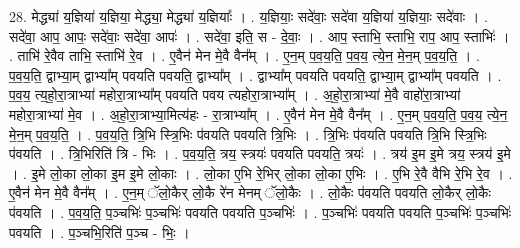 \documentclass[17pt]{extarticle}
\begin{document}
28. मेद्ध्या॑ य॒ज्ञिया॑ य॒ज्ञिया॒ मेद्ध्या॒ मेद्ध्या॑ य॒ज्ञियाः᳚ । . य॒ज्ञियाः॒ सदे॑वाः॒ सदे॑वा य॒ज्ञिया॑ य॒ज्ञियाः॒ सदे॑वाः । . सदे॑वा॒ आप॒ आपः॒ सदे॑वाः॒ सदे॑वा॒ आपः॑ । . सदे॑वा॒ इति॒ स - दे॒वाः॒ । . आप॒ स्ताभि॒ स्ताभि॒ राप॒ आप॒ स्ताभिः॑ । . ताभि॑ रे॒वैव ताभि॒ स्ताभि॑ रे॒व । . ए॒वैन॑ मेन मे॒वै वैन᳚म् । . ए॒न॒म् प॒व॒य॒ति॒ प॒व॒य॒ त्ये॒न॒ मे॒न॒म् प॒व॒य॒ति॒ । . प॒व॒य॒ति॒ द्वाभ्या॒म् द्वाभ्या᳚म् पवयति पवयति॒ द्वाभ्या᳚म् । . द्वाभ्या᳚म् पवयति पवयति॒ द्वाभ्या॒म् द्वाभ्या᳚म् पवयति । . प॒व॒य॒ त्य॒हो॒रा॒त्राभ्या॑ महोरा॒त्राभ्या᳚म् पवयति पवय त्यहोरा॒त्राभ्या᳚म् । . अ॒हो॒रा॒त्राभ्या॑ मे॒वै वाहो॑रा॒त्राभ्या॑ महोरा॒त्राभ्या॑ मे॒व । . अ॒हो॒रा॒त्राभ्या॒मित्य॑हः - रा॒त्राभ्या᳚म् । . ए॒वैन॑ मेन मे॒वै वैन᳚म् । . ए॒न॒म् प॒व॒य॒ति॒ प॒व॒य॒ त्ये॒न॒ मे॒न॒म् प॒व॒य॒ति॒ । . प॒व॒य॒ति॒ त्रि॒भि स्त्रि॒भिः प॑वयति पवयति त्रि॒भिः । . त्रि॒भिः प॑वयति पवयति त्रि॒भि स्त्रि॒भिः प॑वयति । . त्रि॒भिरिति॑ त्रि - भिः । . प॒व॒य॒ति॒ त्रय॒ स्त्रयः॑ पवयति पवयति॒ त्रयः॑ । . त्रय॑ इ॒म इ॒मे त्रय॒ स्त्रय॑ इ॒मे । . इ॒मे लो॒का लो॒का इ॒म इ॒मे लो॒काः । . लो॒का ए॒भि रे॒भिर् लो॒का लो॒का ए॒भिः । . ए॒भि रे॒वै वैभि रे॒भि रे॒व । . ए॒वैन॑ मेन मे॒वै वैन᳚म् । . ए॒न॒म् ॅलो॒कैर् लो॒कै रे॑न मेनम् ॅलो॒कैः । . लो॒कैः प॑वयति पवयति लो॒कैर् लो॒कैः प॑वयति । . प॒व॒य॒ति॒ प॒ञ्चभिः॑ प॒ञ्चभिः॑ पवयति पवयति प॒ञ्चभिः॑ । . प॒ञ्चभिः॑ पवयति पवयति प॒ञ्चभिः॑ प॒ञ्चभिः॑ पवयति । . प॒ञ्चभि॒रिति॑ प॒ञ्च - भिः॒ । \newline
\end{document}
